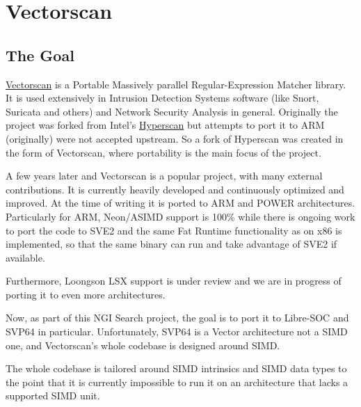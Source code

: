 %

\chapter{Vectorscan}

\section{The Goal}

\href{https://github.com/VectorCamp/vectorscan}{Vectorscan} is a Portable Massively parallel Regular-Expression Matcher library.
It is used extensively in Intrusion Detection Systems software (like Snort, Suricata and others) and Network Security Analysis in general.
Originally the project was forked from Intel's \href{https://github.com/intel/hyperscan}{Hyperscan}
but attempts to port it to \acrshort{ARM} (originally) were not accepted upstream.
So a fork of Hyperscan was created in the form of Vectorscan, where portability is the main focus of the project.
\par

A few years later and Vectorscan is a popular project, with many external contributions.
It is currently heavily developed and continuously optimized and improved.
At the time of writing it is ported to \acrshort{ARM} and \acrshort{POWER} architectures.
Particularly for \acrshort{ARM}, Neon/\acrshort{ASIMD} support is 100\%
while there is ongoing work to port the code to \acrshort{SVE2} and the same Fat Runtime functionality as on x86 is implemented,
so that the same binary can run and take advantage of \acrshort{SVE2} if available.
\par

Furthermore, Loongson \acrshort{LSX} support is under review and we are in progress of porting it to even more architectures.
\par

Now, as part of this \acrshort{NGI} Search project, the goal is to port it to Libre-SOC and \acrshort{SVP64} in particular.
Unfortunately, \acrshort{SVP64} is a Vector architecture not a \acrshort{SIMD} one, and Vectorscan's whole codebase is designed around \acrshort{SIMD}.
\par

The whole codebase is tailored around \acrshort{SIMD} intrinsics and \acrshort{SIMD} data types to the point
that it is currently impossible to run it on an architecture that lacks a supported \acrshort{SIMD} unit.
\par

